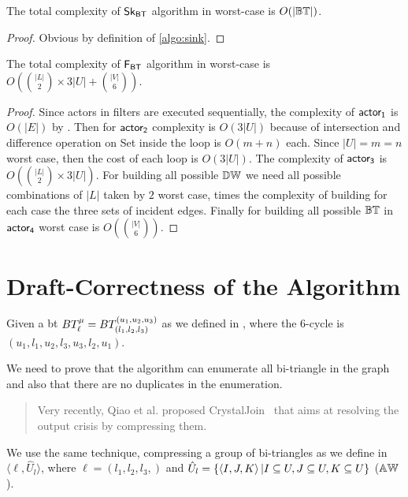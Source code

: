 \begin{proposition}
The total complexity of $\mathsf{Sk_{BT}}$ algorithm in worst-case is $O(|\mathbb{BT}|)$.
\end{proposition}
\begin{proof}
Obvious by definition of \autoref{algo:sink}.
\end{proof}

\begin{proposition}
The total complexity of $\mathsf{F_{BT}}$ algorithm in worst-case is $O(\binom{|L|}{2} \times 3|U| + \binom{|V|}{6})$.
\end{proposition}
\begin{proof}
Since actors in filters are executed sequentially, the complexity of $\mathsf{actor_1}$ is $O(|E|)$ by .
Then for $\mathsf{actor_2}$ complexity is $O(3|U|)$ because of intersection and difference operation on Set inside the loop is $O(m+n)$ each. 
Since $|U| = m = n$ worst case, then the cost of each loop is $O(3|U|)$.  
The complexity of $\mathsf{actor_3}$ is $O(\binom{|L|}{2} \times 3|U|)$. For building all possible $\mathbb{DW}$ we need all possible combinations of $|L|$ taken by $2$ worst case, times the complexity of building for each case the three sets of incident edges.
Finally for building all possible $\mathbb{BT}$ in $\mathsf{actor_4}$ worst case is $O(\binom{|V|}{6})$.
\end{proof}
      
      
\clearpage
\section{Draft-Correctness of the Algorithm}
Given a \acrshort{bt} $BT_{\ell}^{\mu} = BT_{(l_1, l_2,l_3)}^{(u_1, u_2, u_3)}$ as we defined in , where the 6-cycle is $(u_1,l_1,u_2,l_3,u_3,l_2,u_1)$.


We need to prove that the algorithm can enumerate all bi-triangle in the graph and also that there are no duplicates in the enumeration.

\begin{quote}
Very recently, Qiao
et al. proposed CrystalJoin~\cite{Lai} that aims at resolving the
output crisis by compressing them.
\end{quote}

We use the same technique, compressing a group of bi-triangles as we define in  $\langle \ell, \hat{U}_l\rangle$, where $\ell = (l_1,l_2,l_3,)$ and $\hat{U}_l=\{\left\langle I, J, K\right\rangle | I \subseteq U, J \subseteq U, K \subseteq U\}$ ($\mathbb{AW}$).
 

